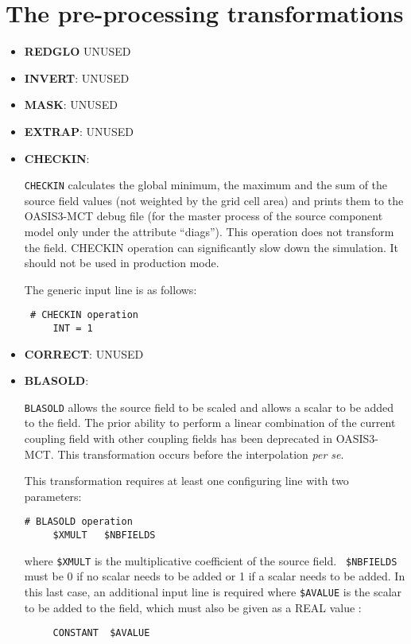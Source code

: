 \section{The pre-processing transformations}
\label{subsec_preproc}

\begin{itemize}

\item {\bf REDGLO} UNUSED

\item {\bf INVERT}: UNUSED

\item {\bf MASK}: UNUSED
 
\item {\bf EXTRAP}: UNUSED

\item {\bf CHECKIN}:

  {\tt CHECKIN} calculates the global minimum, the maximum and the sum
  of the source field values (not weighted by the grid cell area) and
  prints them to the OASIS3-MCT debug file (for the master process of
  the source component model only under the 
  attribute ``diags''). This operation does not transform the field.
  CHECKIN operation can significantly slow down the simulation. It should
  not be used in production mode.

  The generic input line is as follows:
 \begin{verbatim}
 # CHECKIN operation
     INT = 1  
\end{verbatim} 

\item {\bf CORRECT}: UNUSED

\item {\bf BLASOLD}:

  {\tt BLASOLD} allows the source field to be scaled and allows a
  scalar to be added to the field.  The prior ability to perform a
  linear combination of the current coupling field with other coupling
  fields has been deprecated in OASIS3-MCT.  This transformation
  occurs before the interpolation {\it per se}.

  This transformation requires at least one configuring line with two
  parameters:
 \begin{verbatim}
# BLASOLD operation
     $XMULT   $NBFIELDS 
\end{verbatim}
  where {\tt \$XMULT} is the multiplicative coefficient of the source
  field. {\tt
    \$NBFIELDS} must be 0 if no scalar needs to be added or 1 if a
  scalar needs to be added. In this last case, an additional input
  line is required where {\tt \$AVALUE} is the scalar to be added to
  the field, which must also be given as a REAL value :
\begin{verbatim}
     CONSTANT  $AVALUE
\end{verbatim} 
\end{itemize}

